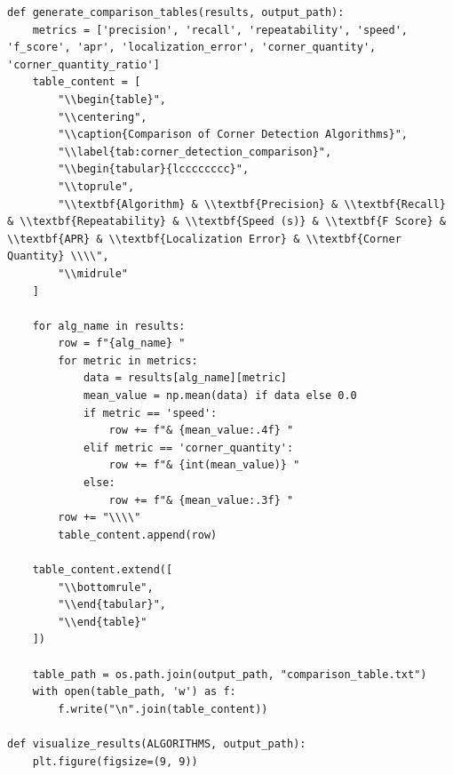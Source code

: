 \documentclass[journal]{IEEEtran}
\begin{document}
\begin{lstlisting}[style=python, caption={Utility Functions for Data Processing}, label={lst:utilities}]
def generate_comparison_tables(results, output_path):
    metrics = ['precision', 'recall', 'repeatability', 'speed', 'f_score', 'apr', 'localization_error', 'corner_quantity', 'corner_quantity_ratio']
    table_content = [
        "\\begin{table}",
        "\\centering",
        "\\caption{Comparison of Corner Detection Algorithms}",
        "\\label{tab:corner_detection_comparison}",
        "\\begin{tabular}{lcccccccc}",
        "\\toprule",
        "\\textbf{Algorithm} & \\textbf{Precision} & \\textbf{Recall} & \\textbf{Repeatability} & \\textbf{Speed (s)} & \\textbf{F Score} & \\textbf{APR} & \\textbf{Localization Error} & \\textbf{Corner Quantity} \\\\",
        "\\midrule"
    ]
    
    for alg_name in results:
        row = f"{alg_name} "
        for metric in metrics:
            data = results[alg_name][metric]
            mean_value = np.mean(data) if data else 0.0
            if metric == 'speed':
                row += f"& {mean_value:.4f} "
            elif metric == 'corner_quantity':
                row += f"& {int(mean_value)} "
            else:
                row += f"& {mean_value:.3f} "
        row += "\\\\"
        table_content.append(row)
    
    table_content.extend([
        "\\bottomrule",
        "\\end{tabular}",
        "\\end{table}"
    ])
    
    table_path = os.path.join(output_path, "comparison_table.txt")
    with open(table_path, 'w') as f:
        f.write("\n".join(table_content))

def visualize_results(ALGORITHMS, output_path):
    plt.figure(figsize=(9, 9))
    

\end{lstlisting}
\end{document}
